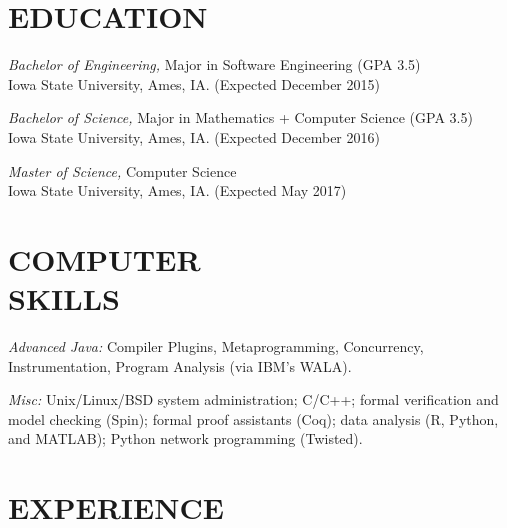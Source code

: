 \documentclass[margin, 10pt]{res} %
\begin{document}
\begin{resume}


\section{EDUCATION}

{\sl Bachelor of Engineering,} Major in Software Engineering (GPA 3.5) \\
Iowa State University, Ames, IA. (Expected December 2015)

{\sl Bachelor of Science,} Major in Mathematics + Computer Science (GPA 3.5) \\
Iowa State University, Ames, IA. (Expected December 2016)

{\sl Master of Science,} Computer Science \\
Iowa State University, Ames, IA. (Expected May 2017)



\section{COMPUTER \\ SKILLS}

{\sl Advanced Java:} Compiler Plugins, Metaprogramming, Concurrency,
  Instrumentation, Program Analysis (via IBM's WALA).

{\sl Misc:} Unix/Linux/BSD system administration; C/C++; formal verification and
  model checking (Spin); formal proof assistants (Coq); data analysis (R,
  Python, and MATLAB); Python network programming (Twisted).


\section{EXPERIENCE}


\end{resume}
\end{document}
